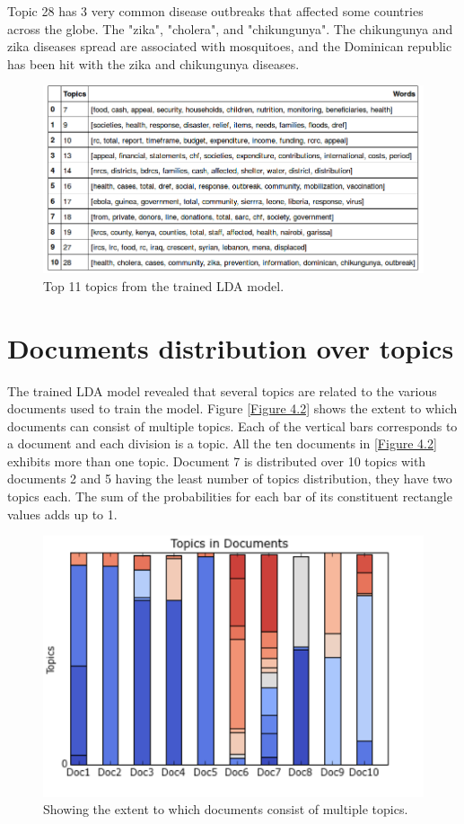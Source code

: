 \begin{flushleft}
Topic 28 has 3 very common disease outbreaks that affected some countries across the globe. The "zika", "cholera", and "chikungunya". The chikungunya and zika diseases spread are associated with mosquitoes, and the Dominican republic has been hit with the zika and chikungunya diseases. 
\end{flushleft}
\begin{figure}[hb]
\centering
\includegraphics[scale=0.6]{c4_2.png}
\caption{Top 11 topics from the trained LDA model.}
\end{figure}\label{Table 4.1}
\section{Documents distribution over topics}
The trained LDA model revealed that several topics are related to the various documents used to train the model. Figure \eqref{Figure 4.2} shows the extent to which documents can consist of multiple topics. Each of the vertical bars corresponds to a document and each division is a topic. All the ten documents in \eqref{Figure 4.2} exhibits more than one topic. Document 7 is distributed over 10 topics with documents 2 and 5 having the least number of topics distribution,  they have two topics each. The sum of the probabilities for each bar of its constituent rectangle values adds up to 1.
\begin{figure}[h]
\centering
\includegraphics[scale=0.85]{c4_3.png}
\caption{Showing the extent to which documents consist of multiple topics.}\label{Figure 4.2}
\end{figure}

